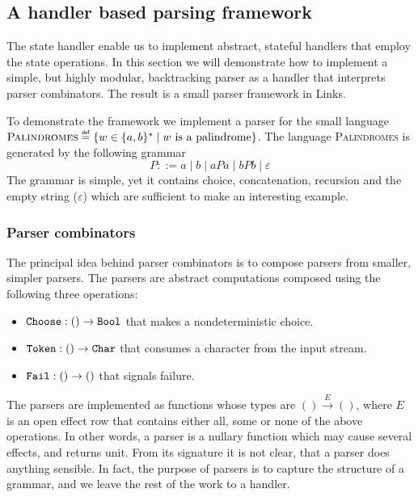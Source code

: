 \subsection{A handler based parsing framework}\label{sec:parserlibrary}
The state handler enable us to implement abstract, stateful handlers that employ the state operations. In this section we will demonstrate how to implement a simple, but highly modular, backtracking parser as a handler that interprets parser combinators. The result is a small parser framework in Links.

To demonstrate the framework we implement a parser for the small language $\text{\scshape{Palindromes}} \defas \{ w \in \{a,b\}^* \; | \; w\text{ is a palindrome}\}$. The language {\scshape{Palindromes}} is generated by the following grammar
\begin{equation}\label{eq:grammar}
  P ::= a \; | \; b \; | \; aPa \; | \; bPb \; | \; \varepsilon
\end{equation}
The grammar is simple, yet it contains choice, concatenation, recursion and the empty string ($\varepsilon$) which are sufficient to make an interesting example.

\subsubsection{Parser combinators}
The principal idea behind parser combinators is to compose parsers from smaller, simpler parsers. The parsers are abstract computations composed using the following three operations:
\begin{itemize}
  \item $\texttt{Choose} : () \to \texttt{Bool}$ that makes a nondeterministic choice.
  \item $\texttt{Token}  : () \to \texttt{Char}$ that consumes a character from the input stream.
  \item $\texttt{Fail}   : () \to ()$ that signals failure.
\end{itemize}
The parsers are implemented as functions whose types are $() \xrightarrow{E} ()$, where $E$ is an open effect row that contains either all, some or none of the above operations. In other words, a parser is a nullary function which may cause several effects, and returns unit. From its signature it is not clear, that a parser does anything sensible. In fact, the purpose of parsers is to capture the structure of a grammar, and we leave the rest of the work to a handler. 

